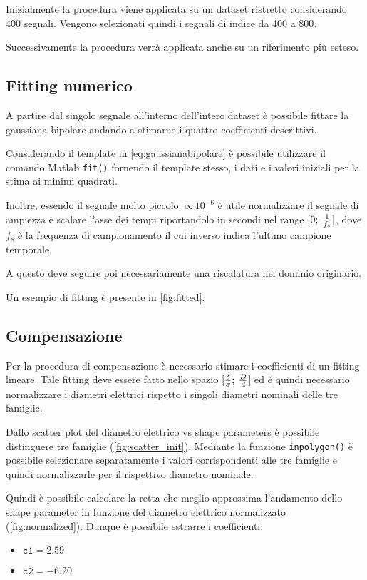 Inizialmente la procedura viene applicata su un dataset ristretto considerando 400 segnali. Vengono selezionati quindi i segnali di indice da 400 a 800.

Successivamente la procedura verrà applicata anche su un riferimento più esteso.

\subsection{Fitting numerico}

A partire dal singolo segnale all'interno dell'intero dataset è possibile fittare la gaussiana bipolare andando a stimarne i quattro coefficienti descrittivi.

Considerando il template in \cref{eq:gaussianabipolare} è possibile utilizzare il comando Matlab \texttt{fit()} fornendo il template stesso, i dati e i valori iniziali per la stima ai minimi quadrati.

Inoltre, essendo il segnale molto piccolo $\propto 10^{-6}$ è utile normalizzare il segnale di ampiezza e scalare l'asse dei tempi riportandolo in secondi nel range $[0;\:{1\over f_s}]$, dove $f_s$ è la frequenza di campionamento il cui inverso indica l'ultimo campione temporale.

A questo deve seguire poi necessariamente una riscalatura nel dominio originario. 

Un esempio di fitting è presente in \cref{fig:fitted}.


\subsection{Compensazione}

Per la procedura di compensazione è necessario stimare i coefficienti di un fitting lineare. Tale fitting deve essere fatto nello spazio $[{\delta\over \sigma};\:{D\over d}$] ed è quindi necessario normalizzare i diametri elettrici rispetto i singoli diametri nominali delle tre famiglie. 

Dallo scatter plot del diametro elettrico vs shape parameters è possibile distinguere tre famiglie (\cref{fig:scatter_init}). Mediante la funzione \texttt{inpolygon()} è possibile selezionare separatamente i valori corrispondenti alle tre famiglie e quindi normalizzarle per il rispettivo diametro nominale. 

Quindi è possibile calcolare la retta che meglio approssima l'andamento dello shape parameter in funzione del diametro elettrico normalizzato (\cref{fig:normalized}). Dunque è possibile estrarre i coefficienti:
\begin{itemize}
	\item $\mathtt{c1}=2.59$
	\item $\mathtt{c2}=-6.20$
\end{itemize}

